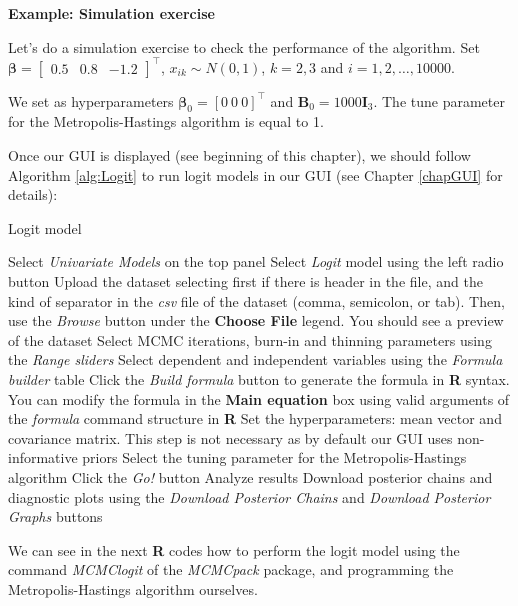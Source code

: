 \textbf{Example: Simulation exercise}

Let's do a simulation exercise to check the performance of the algorithm. Set $\bm{\beta}=\begin{bmatrix}0.5 & 0.8 & -1.2\end{bmatrix}^{\top}$, $x_{ik}\sim N(0,1)$, $k=2,3$ and $i=1,2,\dots,10000$.

We set as hyperparameters $\bm{\beta}_0=[0 \ 0 \ 0]^{\top}$ and ${\bm{B}}_0=1000{\bm{I}}_3$. The tune parameter for the Metropolis-Hastings algorithm is equal to 1.

Once our GUI is displayed (see beginning of this chapter), we should follow Algorithm \ref{alg:Logit} to run logit models in our GUI (see Chapter \ref{chapGUI} for details):
\begin{algorithm}[h!]
	\caption{Logit model}\label{alg:Logit}
	\begin{algorithmic}[1]  		 			
		\State Select \textit{Univariate Models} on the top panel
		\State Select \textit{Logit} model using the left radio button
		\State Upload the dataset selecting first if there is header in the file, and the kind of separator in the \textit{csv} file of the dataset (comma, semicolon, or tab). Then, use the \textit{Browse} button under the \textbf{Choose File} legend. You should see a preview of the dataset
		\State Select MCMC iterations, burn-in and thinning parameters using the \textit{Range sliders}
		\State Select dependent and independent variables using the \textit{Formula builder} table
		\State Click the \textit{Build formula} button to generate the formula in \textbf{R} syntax. You can modify the formula in the \textbf{Main equation} box using valid arguments of the \textit{formula} command structure in \textbf{R}
		\State Set the hyperparameters: mean vector and covariance matrix. This step is not necessary as by default our GUI uses non-informative priors
		\State Select the tuning parameter for the Metropolis-Hastings algorithm
		\State Click the \textit{Go!} button
		\State Analyze results
		\State Download posterior chains and diagnostic plots using the \textit{Download Posterior Chains} and \textit{Download Posterior Graphs} buttons
	\end{algorithmic} 
\end{algorithm}

We can see in the next \textbf{R} codes how to perform the logit model using the command \textit{MCMClogit} of the \textit{MCMCpack} package, and programming the Metropolis-Hastings algorithm ourselves. 

